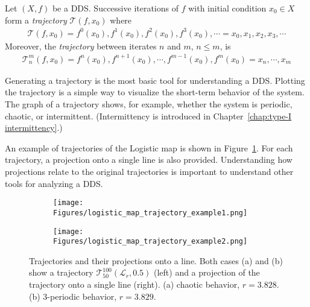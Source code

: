 \begin{definition}[Trajectory]
    Let $\left( X, f \right)$ be a DDS. Successive iterations of $f$ with initial condition $x_0 \in X$ form a \emph{trajectory} $\mathcal{T}(f, x_0)$ where \begin{eqnarray}
        \mathcal{T}(f, x_0) = f^0(x_0), f^1(x_0), f^2(x_0), f^3(x_0), \cdots  = x_0, x_1, x_2, x_3, \cdots
    \end{eqnarray}
    Moreover, the \emph{trajectory} between iterates $n$ and $m$, $n \leq m$, is
    \begin{eqnarray}
        \mathcal{T}_{n}^{m}(f, x_0) = f^{n}(x_0), f^{n+1}(x_0), \cdots, f^{m-1}(x_0), f^{m}(x_0) = x_n, \cdots, x_m
    \end{eqnarray}
\end{definition}

\begin{remark}
    Generating a trajectory is the most basic tool for understanding a DDS.
    Plotting the trajectory is a simple way to visualize the short-term behavior of the system.
    The graph of a trajectory shows, for example, whether the system is periodic, chaotic, or intermittent. (Intermittency is introduced in Chapter~\ref{chap:type-I intermittency}.)
    \par
    An example of trajectories of the Logistic map is shown in Figure~\ref{fig:trajectory_example}.
    For each trajectory, a projection onto a single line is also provided.
    Understanding how projections relate to the original trajectories is important to understand other tools for analyzing a DDS.
\end{remark}

\begin{figure}[!h]
    \centering
    \begin{subfigure}{0.6\textwidth}
        \centering
        \texttt{[image: Figures/logistic\_map\_trajectory\_example1.png]}
        \caption{}
    \end{subfigure}
    \hfill
    \begin{subfigure}{0.6\textwidth}
        \centering
        \texttt{[image: Figures/logistic\_map\_trajectory\_example2.png]}
        \caption{}
    \end{subfigure}

    \caption{
        Trajectories and their projections onto a line.
        Both cases (a) and (b) show a trajectory $\mathcal{T}_{50}^{100}(\mathcal{L}_{r}, 0.5)$ (left) and a projection of the trajectory onto a single line (right). 
        (a) chaotic behavior, $r = 3.828$. 
        (b) $3$-periodic behavior, $r = 3.829$. 
    }
    \label{fig:trajectory_example}
\end{figure}

